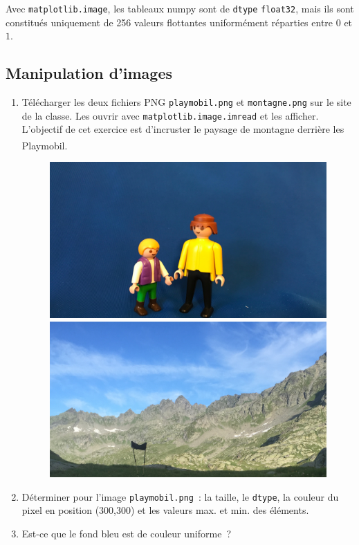 \documentclass[10pt,fleqn]{article} %
\begin{document}
\begin{multicols}{2}
\begin{remark}
  Avec \texttt{matplotlib.image}, les tableaux numpy sont de
  \texttt{dtype} \texttt{float32}, mais ils sont constitués uniquement
  de 256 valeurs flottantes uniformément réparties entre $0$ et $1$.
\end{remark}


\subsection*{Manipulation d'images}

\begin{enumerate}
\item 
  Télécharger les deux fichiers PNG \texttt{playmobil.png} et
  \texttt{montagne.png} sur le site de la classe. Les
  ouvrir avec \texttt{matplotlib.image.imread} et les afficher.\\
  L'objectif de cet exercice est d'incruster le paysage de montagne
  derrière les Playmobil\textsuperscript{\textregistered}.

\begin{figure}[h]
  \centering
  \includegraphics[width=.45\textwidth]{images/theme_image_1_playmobil}
  \includegraphics[width=.45\textwidth]{images/theme_image_1_montagne}
\end{figure}

\item 
  Déterminer pour l'image \texttt{playmobil.png}~: la taille, le
  \texttt{dtype}, la couleur du  pixel en position (300,300) et les
  valeurs max. et min. des éléments. 

\item 
  Est-ce que le fond bleu est de couleur uniforme~?



\end{enumerate}
\end{multicols}
\end{document}
